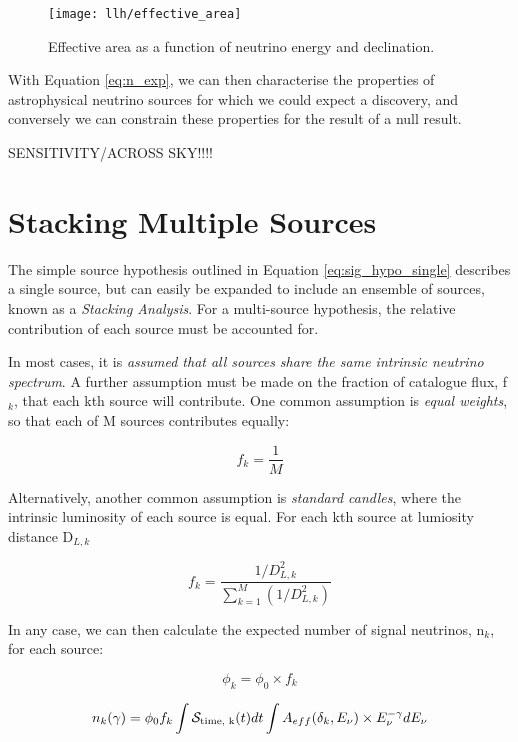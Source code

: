 \begin{figure}[!ht]
	\centering \texttt{[image: llh/effective\_area]}
	\caption{Effective area as a function of neutrino energy and declination.}
	\label{fig:effective_area}
\end{figure}

With Equation \ref{eq:n_exp}, we can then characterise the properties of astrophysical neutrino sources for which we could expect a discovery, and conversely we can constrain these properties for the result of a null result.

SENSITIVITY/ACROSS SKY!!!!

\section{Stacking Multiple Sources}

The simple source hypothesis outlined in Equation \ref{eq:sig_hypo_single} describes a single source, but can easily be expanded to include an ensemble of sources, known as a \emph{Stacking Analysis}. For a multi-source hypothesis, the relative contribution of each source must be accounted for.

In most cases, it is \emph{assumed that all sources share the same intrinsic neutrino spectrum}. A further assumption must be made on the fraction of catalogue flux, f$_{k}$, that each kth source will contribute. One common assumption is \emph{equal weights}, so that each of M sources contributes equally:

\begin{equation}
f_{k} = \frac{1}{M}
\end{equation}

Alternatively, another common assumption is \emph{standard candles}, where the intrinsic luminosity of each source is equal. For each kth source at lumiosity distance D$_{L,k}$

 \begin{equation}
 f_{k} = \frac{1/D_{L,k}^{2}}{\sum^{M}_{k=1}(1/D_{L,k}^{2})}
 \end{equation}

In any case, we can then calculate the expected number of signal neutrinos, n$_{k}$, for each source:

\begin{equation}
\phi_{k} = \phi_{0} \times f_{k}
\end{equation}

\begin{equation}
n_{k} (\gamma) = \phi_{0} f_{k} \int \mathcal{S}_{\textup{time, k}}(t) dt \int A_{eff}(\delta_{k}, E_{\nu}) \times E_{\nu}^{-\gamma} dE_{\nu}
\label{eq:n_k}
\end{equation}

